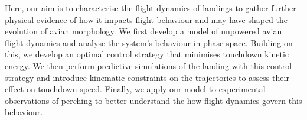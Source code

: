 Here, our aim is to characterise the flight dynamics of landings to gather further physical evidence of how it impacts flight behaviour and may have shaped the evolution of avian morphology. We first develop a model of unpowered avian flight dynamics and analyse the system's behaviour in phase space. Building on this, we develop an optimal control strategy that minimises touchdown kinetic energy. We then perform predictive simulations of the landing with this control strategy and introduce kinematic constraints on the trajectories to assess their effect on touchdown speed. Finally, we apply our model to experimental observations of perching to better understand the how flight dynamics govern this behaviour.
